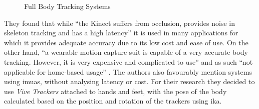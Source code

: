 \begin{figure}[h]
    \centering
    \hfill
    \hfill
    \caption{Full Body Tracking Systems}
    \label{fig:bodyTrackingSystems}
\end{figure}

They found that while \enquote{the Kinect suffers from occlusion, provides
noise in skeleton tracking and has a high latency} \autocite[p. ~3]{bodyTrackingVR} it is used in many applications for which it provides adequate accuracy due to its low cost and ease of use.
\newline
On the other hand, \enquote{a wearable motion capture suit is capable of a very accurate body tracking. However, it is very expensive and complicated to use} and as such \enquote{not applicable for home-based usage}  \autocite[p. ~3]{bodyTrackingVR}.
\newline
The authors also favourably mention systems using \glspl{imua}, without analysing latency or cost. For their research they decided to use \textit{Vive Trackers} attached to hands and feet, with the pose of the body calculated based on the position and rotation of the trackers using \gls{ika}.


